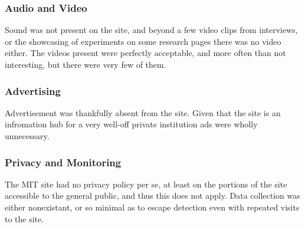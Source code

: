 \subsubsection*{Audio and Video}

Sound was not present on the site, and beyond a few video clips from interviews, or the
showcasing of experiments on some research pages there was no video either. The videos
present were perfectly acceptable, and more often than not interesting, but there were very
few of them.

\subsubsection*{Advertising}

Advertisement was thankfully absent from the site. Given that the site is an infromation hub
for a very well-off private institution ads were wholly unnecessary.

\subsubsection*{Privacy and Monitoring}

The MIT site had no privacy policy per se, at least on the portions of the site accessible to the
general public, and thus this does not apply. Data collection was either nonexistant, or so
minimal as to escape detection even with repeated visits to the site.
